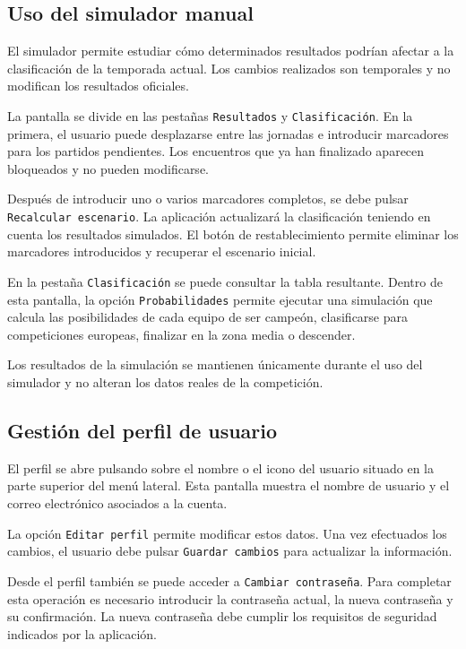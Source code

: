 \subsection{Uso del simulador manual}

El simulador permite estudiar cómo determinados resultados podrían afectar a la clasificación de la temporada actual. Los cambios realizados son temporales y no modifican los resultados oficiales.

La pantalla se divide en las pestañas \texttt{Resultados} y \texttt{Clasificación}. En la primera, el usuario puede desplazarse entre las jornadas e introducir marcadores para los partidos pendientes. Los encuentros que ya han finalizado aparecen bloqueados y no pueden modificarse.

Después de introducir uno o varios marcadores completos, se debe pulsar \texttt{Recalcular escenario}. La aplicación actualizará la clasificación teniendo en cuenta los resultados simulados. El botón de restablecimiento permite eliminar los marcadores introducidos y recuperar el escenario inicial.

En la pestaña \texttt{Clasificación} se puede consultar la tabla resultante. Dentro de esta pantalla, la opción \texttt{Probabilidades} permite ejecutar una simulación que calcula las posibilidades de cada equipo de ser campeón, clasificarse para competiciones europeas, finalizar en la zona media o descender.

Los resultados de la simulación se mantienen únicamente durante el uso del simulador y no alteran los datos reales de la competición.

\subsection{Gestión del perfil de usuario}

El perfil se abre pulsando sobre el nombre o el icono del usuario situado en la parte superior del menú lateral. Esta pantalla muestra el nombre de usuario y el correo electrónico asociados a la cuenta.

La opción \texttt{Editar perfil} permite modificar estos datos. Una vez efectuados los cambios, el usuario debe pulsar \texttt{Guardar cambios} para actualizar la información.

Desde el perfil también se puede acceder a \texttt{Cambiar contraseña}. Para completar esta operación es necesario introducir la contraseña actual, la nueva contraseña y su confirmación. La nueva contraseña debe cumplir los requisitos de seguridad indicados por la aplicación.

